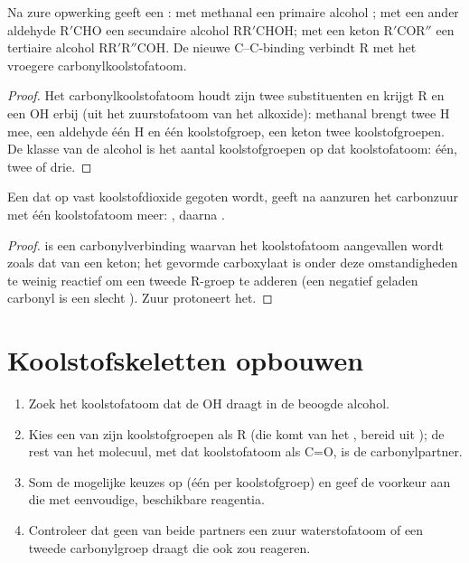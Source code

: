 \begin{proposition}\label{prop:b1:organomagnesium:carbonyl-addition}
Na zure opwerking geeft een  : met methanal een
primaire alcohol ; met een ander aldehyde $\mathrm{R'CHO}$ een
secundaire alcohol $\mathrm{RR'CHOH}$; met een keton $\mathrm{R'COR''}$ een
tertiaire alcohol $\mathrm{RR'R''COH}$. De nieuwe C--C-binding verbindt R
met het vroegere carbonylkoolstofatoom.
\end{proposition}

\begin{proof}
Het carbonylkoolstofatoom houdt zijn twee substituenten en krijgt R en
een OH erbij (uit het zuurstofatoom van het alkoxide): methanal brengt
twee H mee, een aldehyde één H en één koolstofgroep, een keton twee
koolstofgroepen. De klasse van de alcohol is het aantal koolstofgroepen
op dat koolstofatoom: één, twee of drie.
\end{proof}

\begin{proposition}\label{prop:b1:organomagnesium:co2}
Een  dat op vast koolstofdioxide gegoten wordt, geeft na
aanzuren het carbonzuur  met één koolstofatoom meer:
, daarna .
\end{proposition}

\begin{proof}
 is een carbonylverbinding waarvan het koolstofatoom aangevallen
wordt zoals dat van een keton; het gevormde carboxylaat is onder deze
omstandigheden te weinig reactief om een tweede R-groep te adderen (een
negatief geladen carbonyl is een slecht ). Zuur protoneert
het.
\end{proof}

\section{Koolstofskeletten opbouwen}

\begin{method}\label{met:b1:organomagnesium:plan-alcohol}
\begin{enumerate}
  \item Zoek het koolstofatoom dat de OH draagt in de beoogde alcohol.
  \item Kies een van zijn koolstofgroepen als R (die komt van het
        , bereid uit ); de rest van het molecuul,
        met dat koolstofatoom als C=O, is de carbonylpartner.
  \item Som de mogelijke keuzes op (één per koolstofgroep) en geef de
        voorkeur aan die met eenvoudige, beschikbare reagentia.
  \item Controleer dat geen van beide partners een zuur waterstofatoom of
        een tweede carbonylgroep draagt die ook zou reageren.
\end{enumerate}
\end{method}

